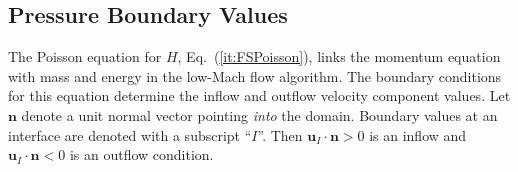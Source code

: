 \documentclass[journal,article,atmosphere,submit,moreauthors,pdftex]{Definitions/mdpi}
\begin{document}




\subsection{Pressure Boundary Values}

The Poisson equation for $H$, Eq.~(\ref{it:FSPoisson}), links the momentum equation with mass and energy in the low-Mach flow algorithm.  The boundary conditions for this equation determine the inflow and outflow velocity component values.  Let $\mathbf{n}$ denote a unit normal vector pointing \emph{into} the domain.  Boundary values at an interface are denoted with a subscript ``$I$''.  Then $\mathbf{u}_I\cdot\mathbf{n}>0$ is an inflow and $\mathbf{u}_I\cdot\mathbf{n}<0$ is an outflow condition.
\end{document}
